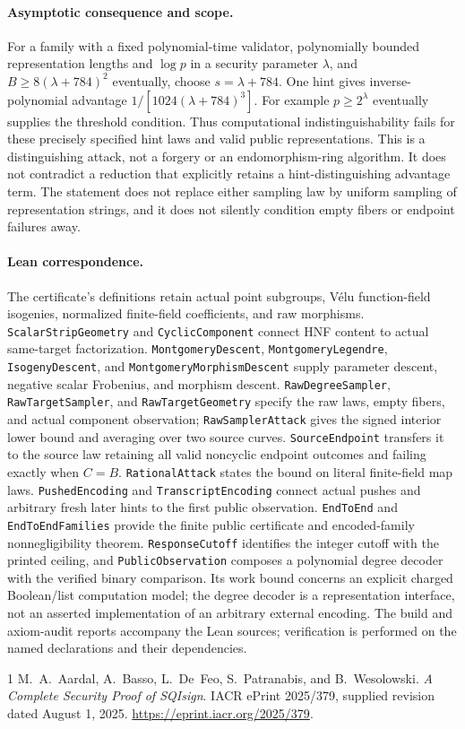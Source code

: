 \documentclass[11pt]{article}
\begin{document}
\paragraph{Asymptotic consequence and scope.}
For a family with a fixed polynomial-time validator, polynomially bounded
representation lengths and $\log p$ in a security parameter $\lambda$, and
$B\ge8(\lambda+784)^2$ eventually, choose $s=\lambda+784$.
One hint gives inverse-polynomial advantage $1/[1024(\lambda+784)^3]$.
For example $p\ge2^\lambda$ eventually supplies the threshold condition.
Thus computational indistinguishability fails for these precisely specified
hint laws and valid public representations. This is a distinguishing attack,
not a forgery or an endomorphism-ring algorithm. It does not contradict a
reduction that explicitly retains a hint-distinguishing advantage term.
The statement does not replace either sampling law by uniform sampling of
representation strings, and it does not silently condition empty fibers or
endpoint failures away.

\paragraph{Lean correspondence.}
\begingroup\raggedright
The certificate's definitions retain actual point subgroups, V\'elu function-field
isogenies, normalized finite-field coefficients, and raw morphisms.
\texttt{ScalarStripGeometry} and \texttt{CyclicComponent} connect HNF content to
actual same-target factorization. \texttt{MontgomeryDescent},
\texttt{MontgomeryLegendre}, \texttt{IsogenyDescent}, and
\texttt{MontgomeryMorphismDescent} supply parameter descent, negative scalar
Frobenius, and morphism descent. \texttt{RawDegreeSampler},
\texttt{RawTargetSampler}, and \texttt{RawTargetGeometry} specify the raw laws,
empty fibers, and actual component observation; \texttt{RawSamplerAttack} gives
the signed interior lower bound and averaging over two source curves.
\texttt{SourceEndpoint} transfers it to the source law retaining all valid
noncyclic endpoint outcomes and failing exactly when $C=B$.
\texttt{RationalAttack} states the bound on literal finite-field map laws.
\texttt{PushedEncoding} and \texttt{TranscriptEncoding} connect actual pushes
and arbitrary fresh later hints to the first public observation.
\texttt{EndToEnd} and \texttt{EndToEndFamilies} provide the finite public
certificate and encoded-family nonnegligibility theorem.
\texttt{ResponseCutoff} identifies the integer cutoff with the printed ceiling,
and \texttt{PublicObservation} composes a polynomial degree decoder with the
verified binary comparison. Its work bound concerns an explicit charged
Boolean/list computation model; the degree decoder is a representation
interface, not an asserted implementation of an arbitrary external encoding.
The build and axiom-audit reports accompany the Lean sources; verification is
performed on the named declarations and their dependencies.
\par\endgroup

\begin{thebibliography}{1}
M.~A.~Aardal, A.~Basso, L.~De~Feo, S.~Patranabis, and B.~Wesolowski.
\emph{A Complete Security Proof of SQIsign}.
IACR ePrint 2025/379, supplied revision dated August 1, 2025.
\url{https://eprint.iacr.org/2025/379}.
\end{thebibliography}
\end{document}
